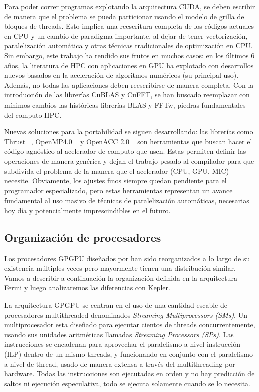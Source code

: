 Para poder correr programas explotando la arquitectura CUDA, se deben escribir de manera que
el problema se pueda particionar usando el modelo de grilla de bloques de threads. Esto implica una
reescritura completa de los c\'odigos actuales en CPU y un cambio de paradigma importante, al
dejar de tener vectorizaci\'on, paralelizaci\'on autom\'atica y otras t\'ecnicas tradicionales
de optimizaci\'on en CPU. Sin embargo, este trabajo ha rendido sus frutos en muchos casos:
en los \'ultimos 6 a\~nos, la literatura de HPC con aplicaciones en GPU ha explotado con
desarrollos nuevos basados en la aceleraci\'on de algoritmos num\'ericos (su principal uso).
Adem\'as, no todas las aplicaciones deben reescribirse de manera completa. Con la introducci\'on
de las librer\'ias CuBLAS y CuFFT, se han buscado reemplazar con m\'inimos cambios las hist\'oricas
librer\'ias BLAS y FFTw, piedras fundamentales del computo HPC.~\cite{cublas}~\cite{cufft}

Nuevas soluciones para la portabilidad se siguen desarrollando: las librer\'ias como Thrust ~\cite{thrust},
OpenMP4.0 ~\cite{OpenMPspec} y OpenACC 2.0 ~\cite{OpenACCSpec} son herramientas que buscan hacer el
c\'odigo agn\'ostico al acelerador de computo que usen. Estas permiten definir las operaciones de
manera gen\'erica y dejan el trabajo pesado al compilador para que subdivida el problema de la manera
que el acelerador (CPU, GPU, MIC) necesite. Obviamente, los ajustes finos siempre quedan pendiente para
el programador especializado, pero estas herramientas representan un avance fundamental al uso
masivo de t\'ecnicas de paralelizaci\'on autom\'aticas, necesarias hoy d\'ia y potencialmente
imprescindibles en el futuro.

\subsection{Organizaci\'on de procesadores}

Los procesadores GPGPU dise\~nados por \nvidia{} han sido reorganizados a lo largo de su
existencia m\'ultiples veces pero mayormente tienen una distribuci\'on similar. Vamos a describir a continuaci\'on
la organizaci\'on definida en la arquitectura Fermi y luego analizaremos las diferencias con Kepler.

La arquitectura GPGPU se centran en el uso de una cantidad escable de procesadores
multithreaded denominados \textit{Streaming Multiprocessors (SMs)}. Un multiprocesador esta dise\~nado
para ejecutar cientos de threads concurrentemente, usando sus unidades aritm\'eticas llamadas \textit{Streaming
Processors (SPs)}. Las instrucciones se encadenan para aprovechar el paralelismo
a nivel instrucci\'on (ILP) dentro de un mismo threads, y funcionando en conjunto con el paralelismo
a nivel de thread, usado de manera extensa a trav\'es del multithreading por hardware. Todas las instrucciones
son ejecutadas en orden y no hay predicci\'on de saltos ni ejecuci\'on especulativa, todo se ejecuta solamente
cuando se lo necesita. ~\cite{CudaOverview}

